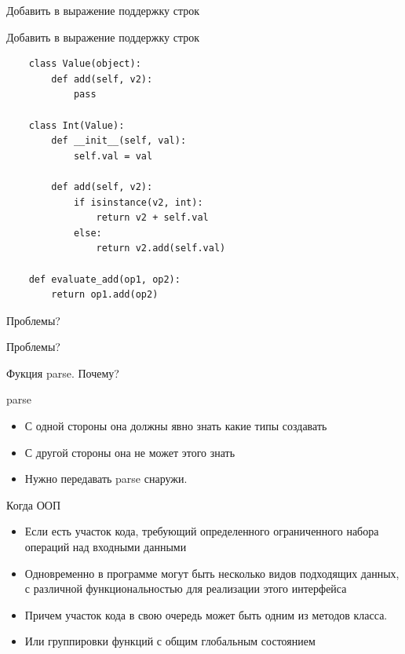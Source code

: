 \documentclass{article}
\begin{document}
\begin{center} Добавить в выражение поддержку строк \end{center}
\newpage

\begin{center} Добавить в выражение поддержку строк \end{center}
\begin{lstlisting}
    class Value(object):
        def add(self, v2):
            pass

    class Int(Value):
        def __init__(self, val):
            self.val = val

        def add(self, v2):
            if isinstance(v2, int):
                return v2 + self.val
            else:
                return v2.add(self.val)

    def evaluate_add(op1, op2):
        return op1.add(op2)
\end{lstlisting}
\newpage

\begin{center} Проблемы? \end{center}
\newpage

\begin{center} Проблемы? \end{center}
Фукция parse. Почему?
\newpage

\begin{center} parse \end{center}
\begin{itemize}
    \item С одной стороны она должны явно знать какие типы создавать
    \item С другой стороны она не может этого знать
    \item Нужно передавать parse снаружи.
\end{itemize}
\newpage

\begin{center} Когда ООП \end{center}
\begin{itemize}
    \item Если есть участок кода, требующий определенного ограниченного 
          набора операций над входными данными
    \item Одновременно в программе могут быть несколько видов подходящих данных, 
          с различной функциональностью для реализации этого интерфейса
    \item Причем участок кода в свою очередь может быть одним из методов класса.
    \item Или группировки функций с общим глобальным состоянием
\end{itemize}
\newpage
\end{document}
